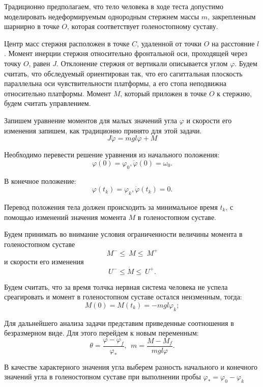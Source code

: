 \documentclass[a4paper,14pt]{article}
\theoremstyle{plain} %
\theoremstyle{definition} %
\theoremstyle{remark} %
\begin{document}
{Традиционно предполагаем, что тело человека в ходе теста допустимо
моделировать недеформируемым однородным стержнем массы $m$,
закрепленным шарнирно в точке $O$, которая соответствует
голеностопному суставу.

Центр масс стержня расположен в точке $C$, удаленной от точки $O$
на расстояние $l$. Момент инерции стержня относительно фронтальной
оси, проходящей через точку $O$, равен $J$. Отклонение стержня от
вертикали описывается углом $\varphi$. Будем считать, что обследуемый
ориентирован так, что его сагиттальная плоскость параллельна оси
чувствительности платформы, а его стопа неподвижна относительно
платформы. Момент $M$, который приложен в точке $O$ к стержню,
будем считать управлением.

Запишем уравнение моментов для малых значений угла $\varphi$ и
скорости его изменения запишем, как традиционно принято для этой задачи.
\begin{equation}\label{6}
    J\ddot{\varphi}= mgl\varphi+M
\end{equation}

Необходимо перевести решение уравнения из начального положения:
\begin{equation}\label{7}
    \varphi(0)=\varphi_0,\dot{\varphi}(0)=\omega_0.
\end{equation}

В конечное положение:
\begin{equation}\label{8}
    \varphi(t_k)=\varphi_k,\dot{\varphi}(t_k)=0.
\end{equation}

Перевод положения тела должен происходить за минимальное
время $t_k$, с помощью изменений значения момента $M$ в
голеностопном суставе.

Будем принимать во внимание условия ограниченности величины
момента в голеностопном суставе
\[
    M^-\le\ M\le\ M^+
\]
и скорости его изменения
\[
    U^-\le\dot{M}\le\ U^+.
\]

Будем считать, что за время толчка нервная система человека
не успела среагировать и момент в голеностопном суставе остался
неизменным, тогда:
\[
    M(0)=M\left(t_k\right)=-mgl\varphi_k;
\]

Для дальнейшего анализа задачи представим приведенные
соотношения в безразмерном виде. Для этого перейдем
к новым переменным:
\[
    \theta=\frac{\varphi-\varphi_f}{\varphi_\ast},\ \ m=\frac{M-M_f}{mgl\varphi}.
\]

В качестве характерного значения угла выберем разность
начального и конечного значений угла в голеностопном
суставе при выполнении пробы $\varphi_\ast=\varphi_0-\varphi_k$

}
\end{document}
